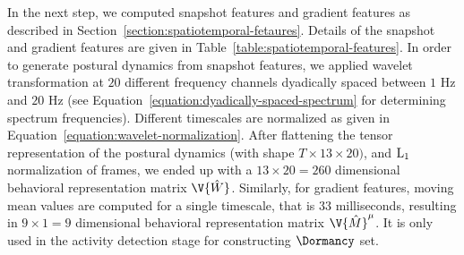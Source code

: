 In the next step, we computed snapshot features and gradient features as described in Section~\ref{section:spatiotemporal-fetaures}. Details of the snapshot and gradient features are given in Table~\ref{table:spatiotemporal-features}.
In order to generate postural dynamics from snapshot features, we applied wavelet transformation at $20$ different frequency channels dyadically spaced between $1$ Hz and $20$ Hz (see Equation~\ref{equation:dyadically-spaced-spectrum} for determining spectrum frequencies). Different timescales are normalized as given in Equation~\ref{equation:wavelet-normalization}. %
After flattening the tensor representation of the postural dynamics (with shape $T \times 13 \times 20)$, and $\textnormal{L}_1$ normalization of frames, we ended up with a $13 \times 20 = 260$ dimensional behavioral representation matrix $\V{\hat{W}}$.
Similarly, for gradient features, moving mean values are computed for a single timescale, that is $33$ milliseconds, resulting in $9 \times 1 = 9$ dimensional behavioral representation matrix $\V{\hat{M}}^\mu$.
It is only used in the activity detection stage for constructing $\Dormancy$ set.

